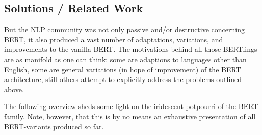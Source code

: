 \subsection{Solutions / Related Work}

But the NLP community was not only passive and/or destructive concerning BERT, it also produced a
vast number of adaptations, variations, and improvements to the vanilla BERT. The motivations
behind all those BERTlings are as manifold as one can think: some are adaptions to languages other
than English, some are general variations (in hope of improvement) of the BERT architecture, still
others attempt to explicitly address the problems outlined above.

The following overview sheds some light on the iridescent potpourri of the BERT
family.
Note, however, that this is by no means an exhaustive presentation of all BERT-variants produced so far.


